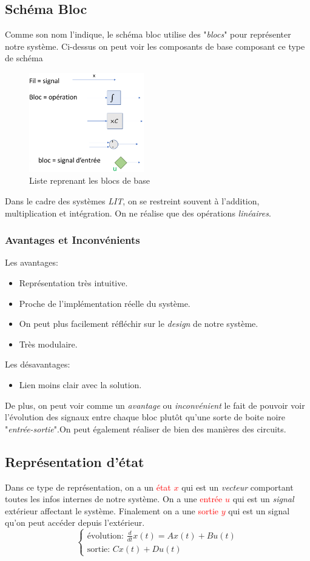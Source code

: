 \documentclass{report}
\begin{document}
\subsection{Schéma Bloc}
Comme son nom l'indique, le schéma bloc utilise des "\textit{blocs}" pour représenter notre système. Ci-dessus on peut voir les composants de base composant ce type de schéma
\begin{figure}[H]
\centering
\includegraphics[width=5cm]{img/blocExemple.png}
\caption{Liste reprenant les blocs de base}
\end{figure}
Dans le cadre des systèmes \textit{LIT}, on se restreint souvent à l'addition, multiplication et intégration. On ne réalise que des opérations \textit{linéaires}.

\subsubsection{Avantages et Inconvénients}
Les avantages:
\begin{itemize}
	\item Représentation très intuitive.
	\item Proche de l'implémentation réelle du système.
	\item On peut plus facilement réfléchir sur le \textit{design} de notre système.
	\item Très modulaire.
\end{itemize}
Les désavantages:
\begin{itemize}
	\item Lien moins clair avec la solution.
\end{itemize}
De plus, on peut voir comme un \textit{avantage} ou \textit{inconvénient} le fait de pouvoir voir l'évolution des signaux entre chaque bloc plutôt qu'une sorte de boite noire "\textit{entrée-sortie}".On peut également réaliser de bien des manières des circuits.

\subsection{Représentation d'état}
Dans ce type de représentation, on a un \textcolor{red}{état $x$} qui est un \textit{vecteur} comportant toutes les infos internes de notre système. On a une  \textcolor{red}{entrée $u$} qui est un \textit{signal} extérieur affectant le système. Finalement on a une \textcolor{red}{sortie $y$} qui est un signal qu'on peut accéder depuis l'extérieur.\\
\begin{equation}
\begin{cases}
\text{évolution: }\frac{d}{dt}x(t) =  Ax(t) + Bu(t)\\
\text{sortie: } C x(t) + D u(t)
\end{cases}
\end{equation}
\end{document}
